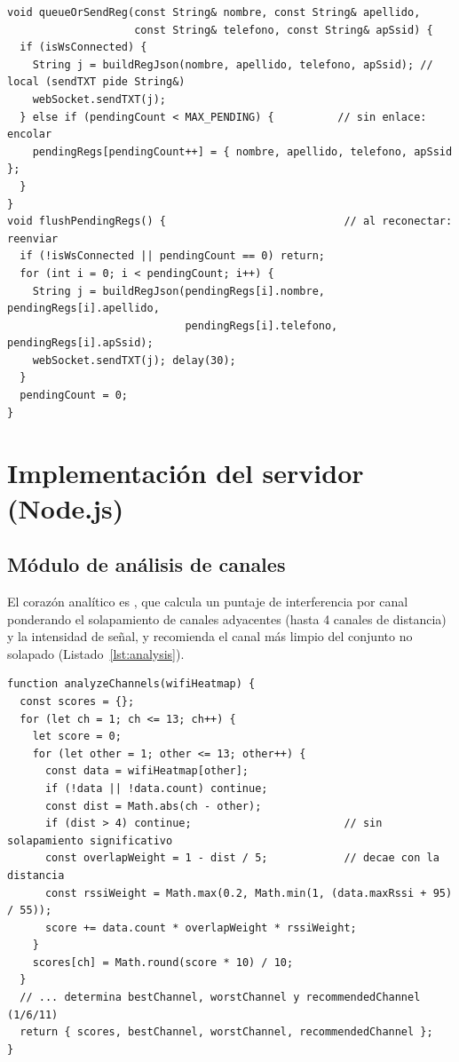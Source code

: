 \begin{lstlisting}[style=cpp,caption={Envío con buffer offline (firmware)},label={lst:buffer}]
void queueOrSendReg(const String& nombre, const String& apellido,
                    const String& telefono, const String& apSsid) {
  if (isWsConnected) {
    String j = buildRegJson(nombre, apellido, telefono, apSsid); // local (sendTXT pide String&)
    webSocket.sendTXT(j);
  } else if (pendingCount < MAX_PENDING) {          // sin enlace: encolar
    pendingRegs[pendingCount++] = { nombre, apellido, telefono, apSsid };
  }
}
void flushPendingRegs() {                            // al reconectar: reenviar
  if (!isWsConnected || pendingCount == 0) return;
  for (int i = 0; i < pendingCount; i++) {
    String j = buildRegJson(pendingRegs[i].nombre, pendingRegs[i].apellido,
                            pendingRegs[i].telefono, pendingRegs[i].apSsid);
    webSocket.sendTXT(j); delay(30);
  }
  pendingCount = 0;
}
\end{lstlisting}


\section{Implementación del servidor (Node.js)}
\subsection{Módulo de análisis de canales}
El corazón analítico es , que calcula un puntaje de interferencia por canal ponderando el solapamiento de canales adyacentes (hasta 4 canales de distancia) y la intensidad de señal, y recomienda el canal más limpio del conjunto no solapado (Listado~\ref{lst:analysis}).

\begin{lstlisting}[style=js,caption={Puntaje de interferencia por canal (lib/analysis.js)},label={lst:analysis}]
function analyzeChannels(wifiHeatmap) {
  const scores = {};
  for (let ch = 1; ch <= 13; ch++) {
    let score = 0;
    for (let other = 1; other <= 13; other++) {
      const data = wifiHeatmap[other];
      if (!data || !data.count) continue;
      const dist = Math.abs(ch - other);
      if (dist > 4) continue;                        // sin solapamiento significativo
      const overlapWeight = 1 - dist / 5;            // decae con la distancia
      const rssiWeight = Math.max(0.2, Math.min(1, (data.maxRssi + 95) / 55));
      score += data.count * overlapWeight * rssiWeight;
    }
    scores[ch] = Math.round(score * 10) / 10;
  }
  // ... determina bestChannel, worstChannel y recommendedChannel (1/6/11)
  return { scores, bestChannel, worstChannel, recommendedChannel };
}
\end{lstlisting}

